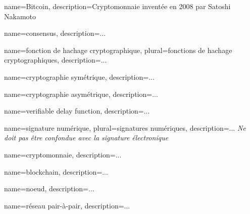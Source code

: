 {
    name=Bitcoin,
    description={Cryptomonnaie inventée en 2008 par Satoshi Nakamoto}
}

{
    name=consensus,
    description={...}
}

{
    name=fonction de hachage cryptographique,
    plural=fonctions de hachage cryptographiques,
    description={...}
}

{
    name=cryptographie symétrique,
    description={...}
}

{
    name=cryptographie asymétrique,
    description={...}
}

{
    name=verifiable delay function,
    description={...}
}

{
    name=signature numérique,
    plural=signatures numériques,
    description={... \textit{Ne doit pas être confondue avec la signature électronique}}
}

{
    name=cryptomonnaie,
    description={...}
}

{
    name=blockchain,
    description={...}
}

{
    name=noeud,
    description={...}
}

{
    name=réseau pair-à-pair,
    description={...}
}